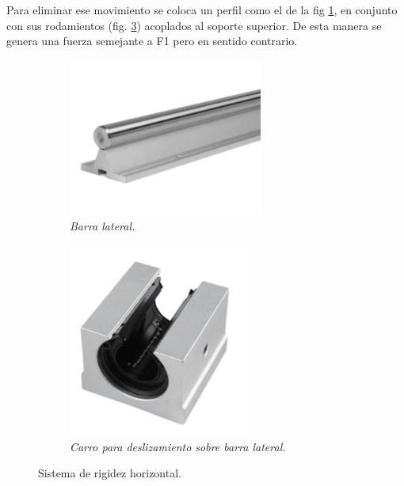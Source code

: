 Para eliminar ese movimiento se coloca un perfil como el de la fig \ref{fig:barra_lateral}, en conjunto con sus rodamientos (fig. \ref{fig:sbr20uu}) acoplados al soporte superior. De esta manera se genera una fuerza semejante a F1 pero en sentido contrario.
\begin{figure}[H]
    \centering
    \begin{subfigure}{0.35\textwidth}
        \centering
        \includegraphics[width=0.7\textwidth]{img/barra_lateral.png}
        \caption{\textit{Barra lateral.}}
        \label{fig:barra_lateral}
    \end{subfigure}
    \hspace{0.5cm}
    \begin{subfigure}{0.35\textwidth}
        \centering
        \includegraphics[width=0.65\textwidth]{img/sbr20uu.png}
        \caption{\textit{Carro para deslizamiento sobre barra lateral.}}
        \label{fig:sbr20uu}
    \end{subfigure}
    \caption{Sistema de rigidez horizontal.}
\end{figure}


